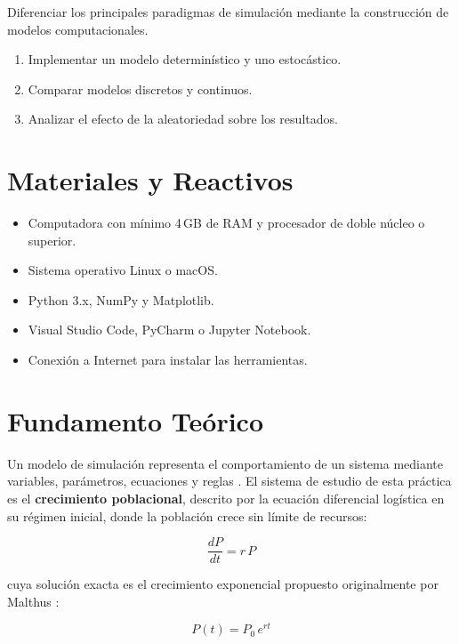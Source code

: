 \documentclass[11pt,a4paper]{article}
\begin{document}
Diferenciar los principales paradigmas de simulaci\'on mediante la construcci\'on de modelos
computacionales.

\begin{enumerate}[leftmargin=*]
  \item Implementar un modelo determin\'istico y uno estoc\'astico.
  \item Comparar modelos discretos y continuos.
  \item Analizar el efecto de la aleatoriedad sobre los resultados.
\end{enumerate}

\section{Materiales y Reactivos}

\begin{itemize}[leftmargin=*]
  \item Computadora con m\'inimo 4\,GB de RAM y procesador de doble n\'ucleo o superior.
  \item Sistema operativo Linux o macOS.
  \item Python 3.x, NumPy y Matplotlib.
  \item Visual Studio Code, PyCharm o Jupyter Notebook.
  \item Conexi\'on a Internet para instalar las herramientas.
\end{itemize}

\section{Fundamento Te\'orico}

Un modelo de simulaci\'on representa el comportamiento de un sistema mediante variables,
par\'ametros, ecuaciones y reglas \cite{lawkelton2015}. El sistema de estudio de esta
pr\'actica es el \textbf{crecimiento poblacional}, descrito por la ecuaci\'on diferencial
log\'istica en su r\'egimen inicial, donde la poblaci\'on crece sin l\'imite de recursos:

\begin{equation}
\frac{dP}{dt} = r\,P
\label{eq:edo}
\end{equation}

cuya soluci\'on exacta es el crecimiento exponencial propuesto originalmente por Malthus
\cite{malthus1798}:

\begin{equation}
P(t) = P_0\,e^{r t}
\label{eq:exponencial}
\end{equation}
\end{document}
